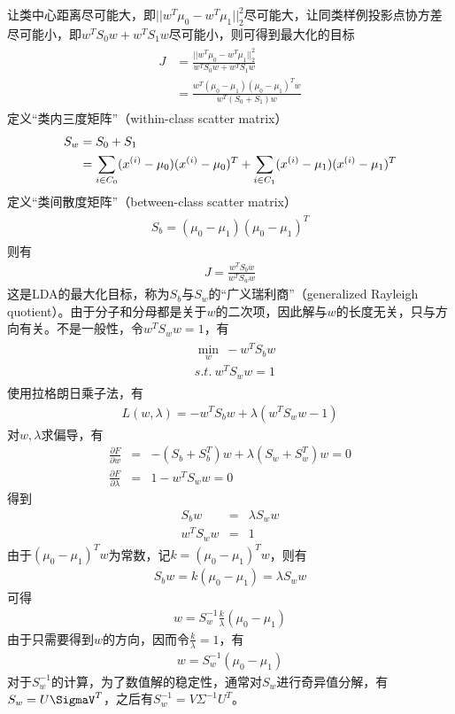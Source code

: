 让类中心距离尽可能大，即$||w^T\mu_0-w^T\mu_1||^2_2$尽可能大，让同类样例投影点协方差尽可能小，即$w^TS_0w+w^TS_1w$尽可能小，则可得到最大化的目标
\begin{eqnarray}
\begin{aligned}
J&=\frac{||w^T\mu_0-w^T\mu_1||^2_2}{w^TS_0w+w^TS_1w}\\
&=\frac{w^T(\mu_0-\mu_1)(\mu_0-\mu_1)^Tw}{w^T(S_0+S_1)w}
\end{aligned}
\end{eqnarray}
定义“类内三度矩阵”（within-class scatter matrix）
\begin{eqnarray}
\begin{aligned}
S_w &=S_0+S_1\\
&=\sum_{i\in C_0}({x}^{({i})}-\mu_0)({x}^{({i})}-\mu_0)^T+\sum_{i\in C_1}({x}^{({i})}-\mu_1)({x}^{({i})}-\mu_1)^T
\end{aligned}
\end{eqnarray}
定义“类间散度矩阵”（between-class scatter matrix）
\begin{eqnarray}
\begin{aligned}
S_b=(\mu_0-\mu_1)(\mu_0-\mu_1)^T
\end{aligned}
\end{eqnarray}
则有
\begin{eqnarray}
J=\frac{w^TS_bw}{w^TS_ww}
\end{eqnarray}
这是LDA的最大化目标，称为$S_b$与$S_w$的“广义瑞利商”（generalized Rayleigh quotient）。由于分子和分母都是关于$w$的二次项，因此解与$w$的长度无关，只与方向有关。不是一般性，令$w^TS_ww=1$，有
\begin{eqnarray}
\begin{aligned}
&\min_w\ -w^TS_bw\\
&s.t.\ w^TS_ww=1
\end{aligned}
\end{eqnarray}
使用拉格朗日乘子法，有
\begin{eqnarray}
L(w,\lambda)=-w^TS_bw+\lambda(w^TS_ww-1)
\end{eqnarray}
对$w,\lambda$求偏导，有
\begin{eqnarray}
\frac{\partial F}{\partial w}&=&-(S_b+S_b^T)w+\lambda(S_w+S_w^T)w=0\\
\frac{\partial F}{\partial \lambda}&=&1-w^TS_ww=0
\end{eqnarray}
得到
\begin{eqnarray}
S_bw&=&\lambda S_ww\\
w^TS_ww&=&1
\end{eqnarray}
由于$(\mu_0-\mu_1)^Tw$为常数，记$k=(\mu_0-\mu_1)^Tw$，则有
\begin{eqnarray}
S_bw=k(\mu_0-\mu_1)=\lambda S_ww
\end{eqnarray}
可得
\begin{eqnarray}
w=S_w^{-1}\frac{k}{\lambda}(\mu_0-\mu_1)
\end{eqnarray}
由于只需要得到$w$的方向，因而令$\frac{k}{\lambda}=1$，有
\begin{eqnarray}
w=S_w^{-1}(\mu_0-\mu_1)
\end{eqnarray}
对于$S_w^{-1}$的计算，为了数值解的稳定性，通常对$S_w$进行奇异值分解，有
$S_w=U\SigmaV^T$，之后有$S_w^{-1}=V\Sigma^{-1}U^T$。

